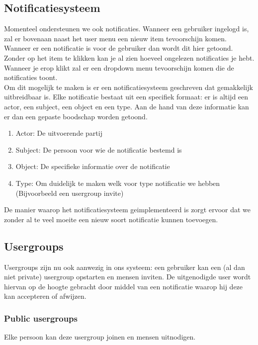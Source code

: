 \documentclass[11pt, a4paper]{article}
\begin{document}
\subsection{Notificatiesysteem}
Momenteel ondersteunen we ook notificaties. Wanneer een gebruiker ingelogd is, zal er bovenaan naast het user menu een nieuw item tevoorschijn komen. Wanneer er een notificatie is voor de gebruiker dan wordt dit hier getoond. Zonder op het item te klikken kan je al zien hoeveel ongelezen notificaties je hebt. Wanneer je erop klikt zal er een dropdown menu tevoorschijn komen die de notificaties toont. \\ 
Om dit mogelijk te maken is er een notificatiesysteem geschreven dat gemakkelijk uitbreidbaar is. Elke notificatie bestaat uit een specifiek formaat: er is altijd een actor, een subject, een object en een type. Aan de hand van deze informatie kan er dan een gepaste boodschap worden getoond. 
\begin{enumerate}
\item Actor: De uitvoerende partij
\item Subject: De persoon voor wie de notificatie bestemd is
\item Object: De specifieke informatie over de notificatie
\item Type: Om duidelijk te maken welk voor type notificatie we hebben (Bijvoorbeeld een usergroup invite)
\end{enumerate}
De manier waarop het notificatiesysteem geimplementeerd is zorgt ervoor dat we zonder al te veel moeite een nieuw soort notificatie kunnen toevoegen.

\subsection{Usergroups}
Usergroups zijn nu ook aanwezig in ons systeem: een gebruiker kan een (al dan niet private) usergroup opstarten en mensen inviten. De uitgenodigde user wordt hiervan op de hoogte gebracht door middel van een notificatie waarop hij deze kan accepteren of afwijzen.
\subsubsection{Public usergroups}
Elke persoon kan deze usergroup joinen en mensen uitnodigen.
\end{document}
